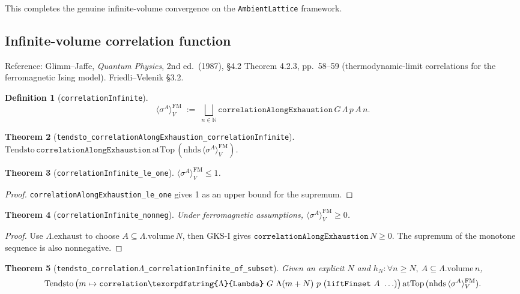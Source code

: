 \documentclass[a4paper,11pt]{article}
\newtheorem{theorem}{Theorem}
\newtheorem{definition}[theorem]{Definition}
\newcommand{\LeanLambda}{\texorpdfstring{\ensuremath{\Lambda}}{Lambda}}
\begin{document}
This completes the genuine infinite-volume convergence on the
\texttt{AmbientLattice} framework.

\subsection{Infinite-volume correlation function}

Reference: Glimm--Jaffe, \textit{Quantum Physics}, 2nd ed.\ (1987),
\S 4.2 Theorem 4.2.3, pp.\ 58--59 (thermodynamic-limit correlations for
the ferromagnetic Ising model).
Friedli--Velenik \S 3.2.

\begin{definition}[\texttt{correlationInfinite}]
\[
\langle \sigma^A \rangle_V^{\mathrm{FM}} \;:=\;
  \bigsqcup_{n \in \mathbb{N}} \texttt{correlationAlongExhaustion}\,G\,\Lambda\,p\,A\,n.
\]
\end{definition}

\begin{theorem}[\texttt{tendsto\_correlationAlongExhaustion\_correlationInfinite}]
$\text{Tendsto}\,\texttt{correlationAlongExhaustion}\,\text{atTop}\,
  (\text{nhds}\,\langle \sigma^A \rangle_V^{\mathrm{FM}})$.
\end{theorem}

\begin{theorem}[\texttt{correlationInfinite\_le\_one}]
$\langle \sigma^A \rangle_V^{\mathrm{FM}} \le 1$.
\end{theorem}

\begin{proof}
\texttt{correlationAlongExhaustion\_le\_one} gives 1 as an upper bound for
the supremum.
\end{proof}

\begin{theorem}[\texttt{correlationInfinite\_nonneg}]
Under ferromagnetic assumptions,
$\langle \sigma^A \rangle_V^{\mathrm{FM}} \ge 0$.
\end{theorem}

\begin{proof}
Use $\Lambda.\text{exhaust}$ to choose
$A \subseteq \Lambda.\text{volume}\,N$, then GKS-I gives
$\texttt{correlationAlongExhaustion}\,N \ge 0$. The supremum of the
monotone sequence is also nonnegative.
\end{proof}

\begin{theorem}[\texttt{tendsto\_correlation\LeanLambda\_correlationInfinite\_of\_subset}]
Given an explicit $N$ and
$h_N : \forall n \ge N,\ A \subseteq \Lambda.\text{volume}\,n$,
\[
\text{Tendsto}\,\bigl(m \mapsto \texttt{correlation\LeanLambda}~G~\Lambda(m+N)~p~
  (\texttt{liftFinset}~A~\ldots)\bigr)\,\text{atTop}\,
  (\text{nhds}\,\langle \sigma^A \rangle_V^{\mathrm{FM}}).
\]
\end{theorem}
\end{document}
